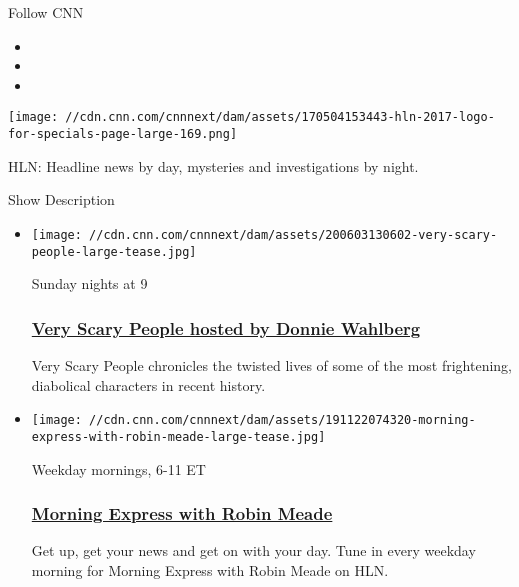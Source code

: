 Follow CNN

\begin{itemize}
\item
\item
\item
\end{itemize}

\texttt{[image: //cdn.cnn.com/cnnnext/dam/assets/170504153443-hln-2017-logo-for-specials-page-large-169.png]}

HLN: Headline news by day, mysteries and investigations by night.

Show Description

\href{//facebook.com/HLN}{}

\href{//twitter.com/HLNTV}{}

\begin{itemize}
\item
  \href{https://www.cnncreativemarketing.com/project/veryscarypeople/}{}

  \texttt{[image: //cdn.cnn.com/cnnnext/dam/assets/200603130602-very-scary-people-large-tease.jpg]}

  Sunday nights at 9

  \hypertarget{very-scary-people-hosted-by-donnie-wahlberg}{%
  \subsubsection{\texorpdfstring{\href{https://www.cnncreativemarketing.com/project/veryscarypeople/}{Very
  Scary People hosted by Donnie
  Wahlberg}}{Very Scary People hosted by Donnie Wahlberg}}\label{very-scary-people-hosted-by-donnie-wahlberg}}

  Very Scary People chronicles the twisted lives of some of the most
  frightening, diabolical characters in recent history.
\end{itemize}

\begin{itemize}
\item
  \href{/shows/morning-express}{}

  \texttt{[image: //cdn.cnn.com/cnnnext/dam/assets/191122074320-morning-express-with-robin-meade-large-tease.jpg]}

  Weekday mornings, 6-11 ET

  \hypertarget{morning-express-with-robin-meade}{%
  \subsubsection{\texorpdfstring{\href{/shows/morning-express}{Morning
  Express with Robin
  Meade}}{Morning Express with Robin Meade}}\label{morning-express-with-robin-meade}}

  Get up, get your news and get on with your day. Tune in every weekday
  morning for Morning Express with Robin Meade on HLN.
\end{itemize}

